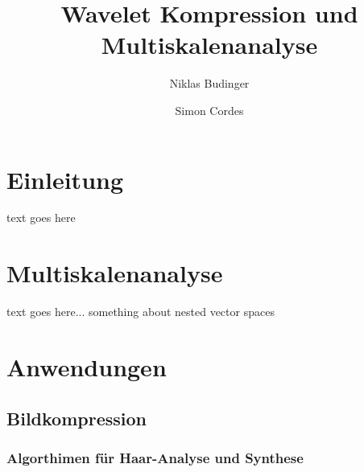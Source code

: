 \documentclass{article}
\begin{document}
%
\title{Wavelet Kompression und Multiskalenanalyse}
\author{Niklas Budinger \and Simon Cordes}
\maketitle
%
\section{Einleitung}
%
text goes here
%
\section{Multiskalenanalyse}
%
text goes here... something about nested vector spaces
%
\section{Anwendungen}
%
\subsection{Bildkompression}
%
\subsubsection{Algorthimen für Haar-Analyse und Synthese}
%
\end{document}
